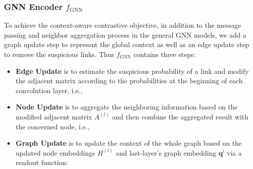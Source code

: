 {\subsubsection{GNN Encoder $f_{\text{GNN}}$ }

To achieve the context-aware contrastive objective, in addition to the message passing and neighbor aggregation process in the general GNN models, we add a graph update step to represent the global context as well as an edge update step to remove the suspicious links.
Thus $f_{\text{GNN}}$ contains three steps:

\begin{itemize}[leftmargin=*]
	\item \textbf{Edge Update} is to estimate the suspicious probability of a link and modify the adjacent matrix according to the probabilities at the beginning of each convolution layer, i.e., 
	
	
	\item \textbf{Node Update} is to aggregate the neighboring information based on the modified adjacent matrix ${A}^{(l)}$ and then combine the aggregated result with the concerned node, i.e.,
	
	
	\item \textbf{Graph Update} is to update the context of the whole graph based on the updated node embeddings $H^{(l)}$ and last-layer's graph embedding $\boldsymbol{q}^l$ via a readout function:  
	
	
\end{itemize}




}
